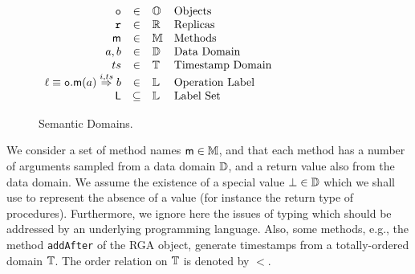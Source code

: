 \begin{wrapfigure}{r}{0.5\linewidth}
  \centering
  \(
  \begin{array}[t]{rcll}
    \mathtt{o} & \in  & \mathbb{O} & \text{Objects} \\
    \mathtt{r} & \in & \mathbb{R} & \text{Replicas} \\
    \mathsf{m} & \in & \mathbb{M} & \text{Methods}\\
    a, b & \in & \mathbb{D} & \text{Data Domain} \\
    ts & \in & \mathbb{T} & \text{Timestamp Domain} \\
    \ell \equiv {{\ensuremath{\mathtt{o}}.\ensuremath{\mathsf{m}}}}(a) \overset{i,ts}{\Rightarrow} b & \in & \mathbb{L} & \text{Operation Label} \\
    \mathsf{L} & \subseteq & \mathbb{L} & \text{Label Set}\\
  \end{array}
  \)
  \caption{Semantic Domains.}
  \label{fig:sem-dom}
\end{wrapfigure}


We consider a set of method names $\mathsf{m} \in \mathbb{M}$, and that
each method has a number of arguments sampled from a data domain
$\mathbb{D}$, and a return value also from the data domain.
%
We assume the existence of a special value $\bot \in \mathbb{D}$
which we shall use to represent the absence of a value (for instance
the return type of procedures).
%
%
Furthermore, we ignore here the issues of typing which should be
addressed by an underlying programming language.
Also, some methods, e.g., the method {\tt addAfter} of the RGA object, generate timestamps from a
totally-ordered domain $\mathbb{T}$. The order relation on $\mathbb{T}$ is denoted by $<$.

